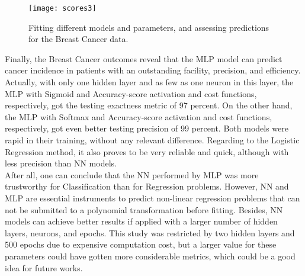 \begin{figure}[H]
\label{fig:scores3}
\texttt{[image: scores3]}
\caption{Fitting different models and parameters, and assessing predictions for the Breast Cancer data.}
\end{figure}

Finally, the Breast Cancer outcomes reveal that the MLP model can predict cancer incidence in patients with an outstanding facility, precision, and efficiency. Actually, with only one hidden layer and as few as one neuron in this layer, the MLP with Sigmoid and Accuracy-score activation and cost functions, respectively, got the testing exactness metric of 97 percent. On the other hand, the MLP with Softmax and Accuracy-score activation and cost functions, respectively, got even better testing precision of 99 percent. Both models were rapid in their training, without any relevant difference. Regarding to the Logistic Regression method, it also proves to be very reliable and quick, although with less precision than NN models.\\

After all, one can conclude that the NN performed by MLP was more trustworthy for Classification than for Regression problems. However, NN and MLP are essential instruments to predict non-linear regression problems that can not be submitted to a polynomial transformation before fitting. Besides, NN models can achieve better results if applied with a larger number of hidden layers, neurons, and epochs. This study was restricted by two hidden layers and 500 epochs due to expensive computation cost, but a larger value for these parameters could have gotten more considerable metrics, which could be a good idea for future works.
